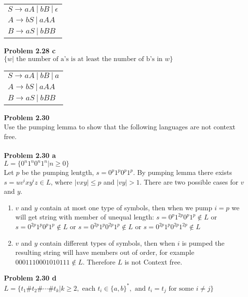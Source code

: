\documentclass{article}
\newcommand{\problem}[1]{\large{\textbf{Problem #1} \\}}
\begin{document}
\begin{table}[h!]
\centering
\begin{tabular}{l}
$S \rightarrow a A\: | \:b B \:|\: \epsilon $\\
$A \rightarrow b S \:| \:a AA $ \\
$B \rightarrow a S \:| \:b BB $ \\
\end{tabular}
\end{table}

\problem{2.28 c}
$\{w| \text{ the number of a's is at least the number of b's in } w\}$

\begin{table}[h!]
\centering
\begin{tabular}{l}
$S \rightarrow a A\: | \:b B \:|\: a $\\
$A \rightarrow b S \:| \:a AA $ \\
$B \rightarrow a S \:| \:b BB $ \\
\end{tabular}
\end{table}

\pagebreak

\problem{2.30}
Use the pumping lemma to show that the following languages are not context free. \\ \\
\problem{2.30 a}
$L = \{ 0^n 1^n 0^n 1^n | n \geq 0  \}$ \\

Let $p$ be the pumping lentgth, $s = 0^p 1^p 0^p 1^p$. By pumping lemma 
there exists $s = uv^ixy^iz \in L$, where $|vxy| \leq p$ and $|vy| > 1$. There are two 
possible cases for $v$ and $y$.
\begin{enumerate}[\underline{Case} 1., leftmargin = 1.5cm]
\itemsep0em
\item $v$ and $y$ contain at most one type of symbols, then when
we pump $i = p$ we will get string with member of unequal length:
 $s = 0^p 1^{2p} 0^p 1^p \notin L$ or $s = 0^{2p} 1^p 0^p 1^p \notin L$ or $s = 0^{2p} 1^p 0^{2p} 1^p \notin L$ or 
$s = 0^{2p} 1^p 0^{2p} 1^{2p} \notin L$
\item $v$ and $y$ contain different types of symbols, then when $i$ is pumped the resulting 
string will have members out of order, for example $0001110001010111 \notin L$. Therefore $L$ is not Context free.
\end{enumerate}

\vspace{0.2cm}
\problem{2.30 d}
$L = \{ t_1 \# t_2 \# \cdots \# t_k | k \geq 2,\text{ each } t_i \in \{a,b\}^*,
\text{ and }t_i = t_j\text{ for some } i \neq j  \}$  \\
\end{document}
